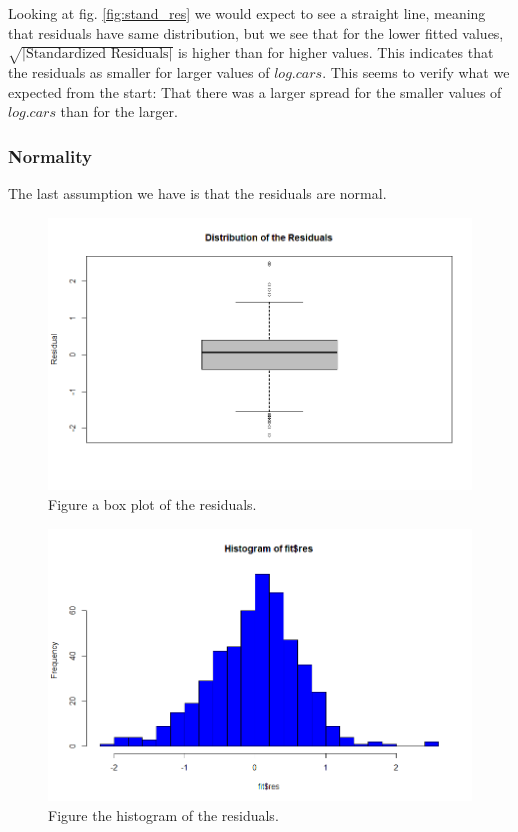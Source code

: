 \documentclass[a4paper,norsk, 10pt]{article}
\begin{document}
Looking at fig. \ref{fig:stand_res} we would expect to see a straight line, meaning that residuals have same distribution, but we see that for the lower fitted values, $\sqrt{|\text{Standardized Residuals}|}$ is higher than for higher values. This indicates that the residuals as smaller for larger values of $log.cars$. This seems to verify what we expected from the start: That there was a larger spread for the smaller values of $log.cars$ than for the larger.


\subsubsection*{Normality} 
The last assumption we have is that the residuals are normal. 

\begin{figure}[!htbp]
\centering
\includegraphics[scale=0.5]{res_box.png}
\caption{Figure a box plot of the residuals.}\label{fig:res_box}
\end{figure}

\begin{figure}[!htbp]
\centering
\includegraphics[scale=0.5]{res_hist.png}
\caption{Figure the histogram of the residuals.}\label{fig:res_hist}
\end{figure}
\end{document}
